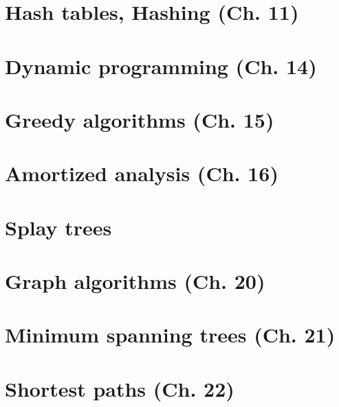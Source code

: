 \documentclass{article}
\begin{document}

\section{Hash tables, Hashing (Ch. 11)}



\section{Dynamic programming (Ch. 14)}



\section{Greedy algorithms (Ch. 15)} %



\section{Amortized analysis (Ch. 16)}


\section{Splay trees}



\section{Graph algorithms (Ch. 20)}



\section{Minimum spanning trees (Ch. 21)}



\section{Shortest paths (Ch. 22)}

\end{document}
